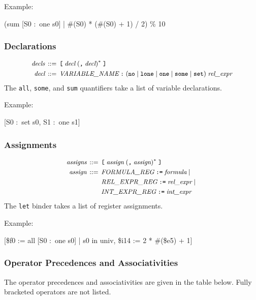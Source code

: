 \documentclass[a4paper,12pt]{article}
\begin{document}
Example:

\pre
\ttfamily\small
(sum [S0 :~one s0] | \#(S0) * (\#(S0) + 1) / 2) \% 10
\post

\subsubsection{Declarations}
\label{declarations}

$$\small\begin{aligned}
\textit{decls} & \,::=\, \verb|[|\; \textit{decl}\; (\verb|,|\; \textit{decl})^*\; \verb|]| \\
\textit{decl} & \,::=\, \textit{VARIABLE\_NAME}\; \verb|:|\; (\verb|no| \mid \verb|lone| \mid \verb|one| \mid \verb|some| \mid \verb|set|)\; \textit{rel\_expr}
\end{aligned}$$
%
The \verb|all|, \verb|some|, and \verb|sum| quantifiers take a list of variable
declarations.

Example:

\pre
\ttfamily\small
[S0 :~set s0, S1 :~one s1]
\post

\subsubsection{Assignments}
\label{assignments}

$$\small\begin{aligned}
\textit{assigns} \,::=\,{} & \verb|[|\; \textit{assign}\; (\verb|,|\; \textit{assign})^*\;\verb|]| \\
\textit{assign} \,::=\,{} & \textit{FORMULA\_REG}\; \verb|:=|\; \textit{formula} \mid {} \\
    & \textit{REL\_EXPR\_REG}\; \verb|:=|\; \textit{rel\_expr} \mid {} \\
    & \textit{INT\_EXPR\_REG}\; \verb|:=|\; \textit{int\_expr}
\end{aligned}$$
%
The \verb|let| binder takes a list of register assignments.

Example:

\pre
\ttfamily\small
[\$f0 := all [S0 :~one s0] | s0 in univ, \$i14 := 2 * \#(\$e5) + 1]
\post

\subsubsection{Operator Precedences and Associativities}
\label{operator-precedences-and-associativities}

The operator precedences and associativities are given in the table below. Fully
bracketed operators are not listed.
\end{document}
